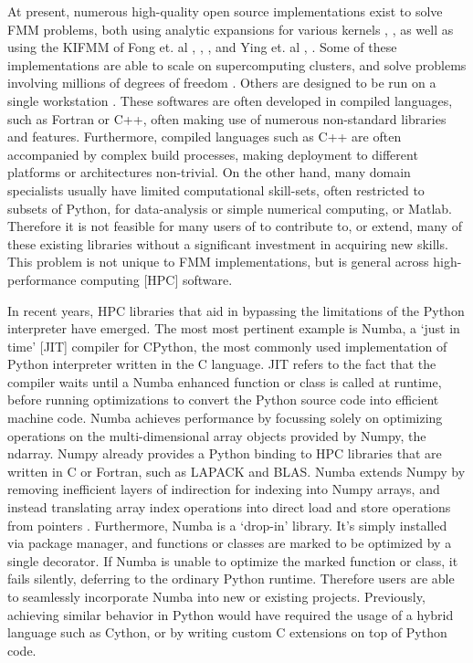 \documentclass{IEEEcsmag}
\begin{document}
At present, numerous high-quality open source implementations exist to solve FMM problems, both using analytic expansions for various kernels \cite{Gimbutas2010}, \cite{Yokota2017}, as well as using the KIFMM of Fong et. al \cite{Bramas2020}, \cite{Agullo2014}, \cite{Agullo2016}, and Ying et. al \cite{Wang2021}, \cite{Lashuk2012}. Some of these implementations are able to scale on supercomputing clusters, and solve problems involving millions of degrees of freedom \cite{Lashuk2012}. Others are designed to be run on a single workstation \cite{Bramas2020, Agullo2014, Wang2021}. These softwares are often developed in compiled languages, such as Fortran or C++, often making use of numerous non-standard libraries and features. Furthermore, compiled languages such as C++ are often accompanied by complex build processes, making deployment to different platforms or architectures non-trivial. On the other hand, many domain specialists usually have limited computational skill-sets, often restricted to subsets of Python, for data-analysis or simple numerical computing, or Matlab. Therefore it is not feasible for many users of to contribute to, or extend, many of these existing libraries without a significant investment in acquiring new skills. This problem is not unique to FMM implementations, but is general across high-performance computing [HPC] software.

In recent years, HPC libraries that aid in bypassing the limitations of the Python interpreter have emerged. The most most pertinent example is Numba, a `just in time' [JIT] compiler for CPython, the most commonly used implementation of Python interpreter written in the C language. JIT refers to the fact that the compiler waits until a Numba enhanced function or class is called at runtime, before running optimizations to convert the Python source code into efficient machine code. Numba achieves performance by focussing solely on optimizing operations on the multi-dimensional array objects provided by Numpy, the ndarray. Numpy already provides a Python binding to HPC libraries that are written in C or Fortran, such as LAPACK and BLAS. Numba extends Numpy by removing inefficient layers of indirection for indexing into Numpy arrays, and instead translating array index operations into direct load and store operations from pointers \cite{Lam2015}. Furthermore, Numba is a `drop-in' library. It's simply installed via package manager, and functions or classes are marked to be optimized by a single decorator. If Numba is unable to optimize the marked function or class, it fails silently, deferring to the ordinary Python runtime. Therefore users are able to seamlessly incorporate Numba into new or existing projects. Previously, achieving similar behavior in Python would have required the usage of a hybrid language such as Cython, or by writing custom C extensions on top of Python code.
\end{document}

